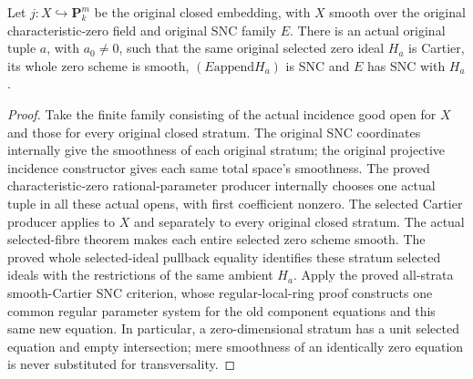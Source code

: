 \begin{theorem}
\label{thm:kn-nadel-bertini-snc-flat-chosen-hyperplane}
\leanok
{}
Let $j:X\hookrightarrow\mathbf P^m_k$ be the original closed embedding,
with $X$ smooth over the original characteristic-zero field and original
SNC family $E$. There is an actual original tuple $a$, with $a_0\ne0$,
such that the same original selected zero ideal $H_a$ is Cartier,
its whole zero scheme is smooth, $(E\mathbin{\mathrm{append}}H_a)$ is
SNC and $E$ has SNC with $H_a$.
\end{theorem}
\begin{proof}
Take the finite family consisting of the actual incidence good open for
$X$ and those for every original closed stratum. The original SNC
coordinates internally give the smoothness of each original stratum;
the original projective incidence constructor gives each same total
space's smoothness. The proved characteristic-zero rational-parameter
producer internally chooses one actual tuple in all these actual opens,
with first coefficient nonzero. The selected Cartier producer applies
to $X$ and separately to every original closed stratum. The actual
selected-fibre theorem makes each entire selected zero scheme smooth.
The proved whole selected-ideal pullback equality identifies these
stratum selected ideals with the restrictions of the same ambient
$H_a$. Apply the proved all-strata smooth-Cartier SNC criterion, whose
regular-local-ring proof constructs one common regular parameter system
for the old component equations and this same new equation. In
particular, a zero-dimensional stratum has a unit selected equation and
empty intersection; mere smoothness of an identically zero equation is
never substituted for transversality.
\end{proof}
